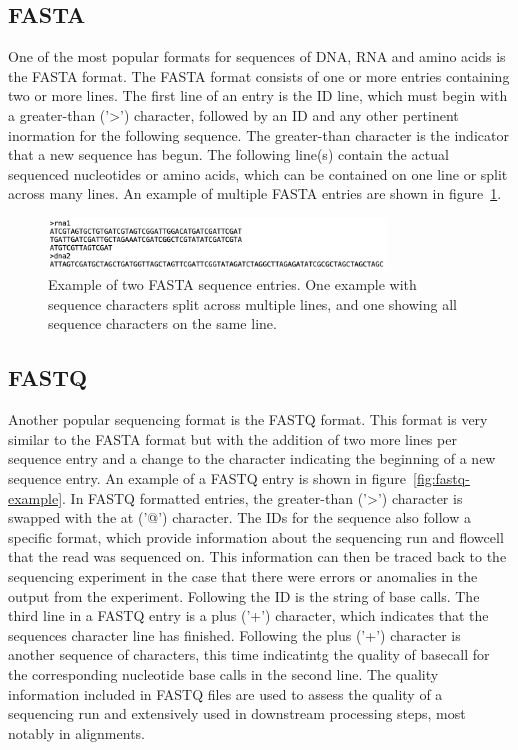 \subsection{FASTA}
One of the most popular formats for sequences of DNA, RNA and amino
acids is the FASTA format. The FASTA format consists of one or more
entries containing two or more lines. The first line of an entry is
the ID line, which must begin with a greater-than ('>') character,
followed by an ID and any other pertinent inormation for the following
sequence. The greater-than character is the indicator that a new
sequence has begun. The following line(s) contain the actual sequenced
nucleotides or amino acids, which can be contained on one line or
split across many lines. An example of multiple FASTA entries are
shown in figure~\ref{fig:fasta-example}.

\begin{figure}
  \centering
  \includegraphics[width=0.8\textwidth]{figures/fasta-example.png}
  \caption{Example of two FASTA sequence entries. One example with
    sequence characters split across multiple lines, and one showing
    all sequence characters on the same line.}
  \label{fig:fasta-example}
\end{figure}

\subsection{FASTQ}
Another popular sequencing format is the FASTQ format. This format is
very similar to the FASTA format but with the addition of two more
lines per sequence entry and a change to the character indicating the
beginning of a new sequence entry. An example of a FASTQ entry is
shown in figure~\ref{fig:fastq-example}. In FASTQ formatted entries,
the greater-than ('>') character is swapped with the at ('@')
character. The IDs for the sequence also follow a specific format,
which provide information about the sequencing run and flowcell that
the read was sequenced on. This information can then be traced back to
the sequencing experiment in the case that there were errors or
anomalies in the output from the experiment. Following the ID is the
string of base calls. The third line in a FASTQ entry is a plus ('+')
character, which indicates that the sequences character line has
finished. Following the plus ('+') character is another sequence of
characters, this time indicatintg the quality of basecall for the
corresponding nucleotide base calls in the second line. The quality
information included in FASTQ files are used to assess the quality of
a sequencing run and extensively used in downstream processing steps,
most notably in alignments.

